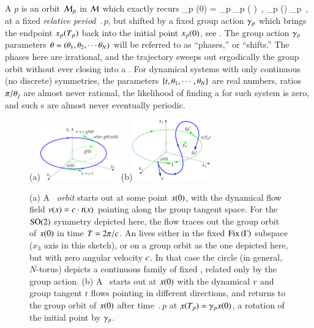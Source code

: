 A {\em \rpo} $p$ is an orbit ${\cal M}_p$ in {\statesp} ${\cal M}$
which exactly recurs
\beq
\ssp_p (0) = \LieEl_p \ssp_p ( )
    \,,\qquad
\ssp_p (\tau) \in \pS_p
    \,,
\label{RPOrelper1}
\eeq
at a fixed {\em relative period} $\period{p}$, but
shifted by a fixed group action ${\gamma_p}$
which brings the endpoint $x_p ({T_{p}} ) $
back into the initial point $x_p (0) $, see .
The group action ${\gamma_p}$ parameters
${\bf \theta} = ({\bf \theta}_1,{\bf \theta}_2,\cdots{\bf \theta}_N)$
will be referred to as ``phases,'' or ``shifts.''
The phases here are irrational, and the trajectory sweeps out
ergodically the group orbit without ever closing into a \po.
For dynamical systems with only continuous (no discrete)
symmetries, the parameters $\{t,{\bf \theta}_1,\cdots,{\bf \theta}_N\}$
are real numbers, ratios $\pi/{\bf \theta}_j$ are almost never
rational, the likelihood of finding a {\po} for such system is
{zero}, and such \rpo s are almost never eventually periodic.

%
\begin{figure}[ht]
(a)\includegraphics[width=0.3\textwidth]{../Fig/reqv.eps}
(b)\includegraphics[width=0.3\textwidth]{../Fig/rpo.eps}
\caption{
(a) A {\em \reqv\ orbit} starts out at some point $x(0)$,
with the dynamical flow field $v(x) = c \cdot
t(x)$ pointing along the group tangent space. For
the $\textrm{SO}(2)$ symmetry depicted here, the flow traces out the
group orbit of $x(0)$ in time ${T_{}}=2\pi/c$.
An
{\em \eqv} lives either in the fixed $\mathrm{Fix}\left(\Gamma\right)$ subspace
($x_3$ axis in this sketch), or on a group orbit as the one
depicted here, but with zero angular velocity $c$. In
that case the circle (in general, $N$-torus) depicts a
continuous family of fixed \eqva, related only by the group
action.
(b) A \rpo\ starts out at $x(0)$ with the dynamical $v$ and
group tangent $t$ flows pointing in different
directions, and returns to the group orbit of $x(0)$ after
time $\period{p}$ at $x({T_{p}})=\gamma_p x (0)$, a
rotation of the initial point by $\gamma_p$.
}
\label{f:rpo}
\end{figure}

